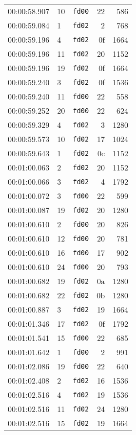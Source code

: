 \documentclass{article}
\begin{document}
\begin{longtable}{lllrr}
00:00:58.907 & 10 & \texttt{fd00} & 22 & 586 \\
00:00:59.084 & 1 & \texttt{fd02} & 2 & 768 \\
00:00:59.196 & 4 & \texttt{fd02} & 0f & 1664 \\
00:00:59.196 & 11 & \texttt{fd02} & 20 & 1152 \\
00:00:59.196 & 19 & \texttt{fd02} & 0f & 1664 \\
00:00:59.240 & 3 & \texttt{fd02} & 0f & 1536 \\
00:00:59.240 & 11 & \texttt{fd00} & 22 & 558 \\
00:00:59.252 & 20 & \texttt{fd00} & 22 & 624 \\
00:00:59.329 & 4 & \texttt{fd02} & 3 & 1280 \\
00:00:59.573 & 10 & \texttt{fd02} & 17 & 1024 \\
00:00:59.643 & 1 & \texttt{fd02} & 0c & 1152 \\
00:01:00.063 & 2 & \texttt{fd02} & 20 & 1152 \\
00:01:00.066 & 3 & \texttt{fd02} & 4 & 1792 \\
00:01:00.072 & 3 & \texttt{fd00} & 22 & 599 \\
00:01:00.087 & 19 & \texttt{fd02} & 20 & 1280 \\
00:01:00.610 & 2 & \texttt{fd00} & 20 & 826 \\
00:01:00.610 & 12 & \texttt{fd00} & 20 & 781 \\
00:01:00.610 & 16 & \texttt{fd00} & 17 & 902 \\
00:01:00.610 & 24 & \texttt{fd00} & 20 & 793 \\
00:01:00.682 & 19 & \texttt{fd02} & 0a & 1280 \\
00:01:00.682 & 22 & \texttt{fd02} & 0b & 1280 \\
00:01:00.887 & 3 & \texttt{fd02} & 19 & 1664 \\
00:01:01.346 & 17 & \texttt{fd02} & 0f & 1792 \\
00:01:01.541 & 15 & \texttt{fd00} & 22 & 685 \\
00:01:01.642 & 1 & \texttt{fd00} & 2 & 991 \\
00:01:02.086 & 19 & \texttt{fd00} & 22 & 640 \\
00:01:02.408 & 2 & \texttt{fd02} & 16 & 1536 \\
00:01:02.516 & 4 & \texttt{fd02} & 19 & 1536 \\
00:01:02.516 & 11 & \texttt{fd02} & 24 & 1280 \\
00:01:02.516 & 15 & \texttt{fd02} & 19 & 1664 \\

\end{longtable}
\end{document}
